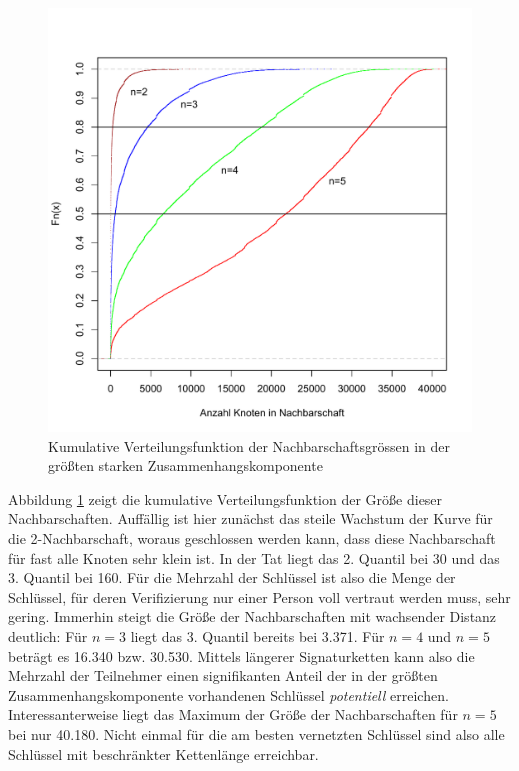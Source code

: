 \begin{figure}[th!]
  \centering
  \includegraphics[scale=0.6]{images/neighbourhood-cdf.pdf}
  \caption{Kumulative Verteilungsfunktion der Nachbarschaftsgrössen
    in der größten starken Zusammenhangskomponente}
  \label{fig:neighbourhood-cdf}
\end{figure}

Abbildung \ref{fig:neighbourhood-cdf} zeigt die kumulative
Verteilungsfunktion der Größe dieser Nachbarschaften. Auffällig
ist hier zunächst das steile Wachstum der Kurve für die
2-Nachbarschaft, woraus geschlossen werden kann, dass diese
Nachbarschaft für fast alle Knoten sehr klein ist. In der Tat liegt
das 2. Quantil bei 30 und das 3. Quantil bei 160. Für die Mehrzahl
der Schlüssel ist also die Menge der Schlüssel, für deren
Verifizierung nur einer Person voll vertraut werden muss, sehr
gering. Immerhin steigt die Größe der Nachbarschaften mit
wachsender Distanz deutlich: Für $n=3$ liegt das 3. Quantil bereits
bei 3.371. Für $n=4$ und $n=5$ beträgt es 16.340 bzw. 30.530. Mittels
längerer Signaturketten kann also die Mehrzahl der Teilnehmer einen
signifikanten Anteil der in der größten Zusammenhangskomponente
vorhandenen Schlüssel \emph{potentiell}
erreichen. Interessanterweise liegt das Maximum der
Größe der Nachbarschaften für $n=5$ bei nur 40.180. Nicht einmal für
die am besten vernetzten Schlüssel sind also alle Schlüssel mit
beschränkter Kettenlänge erreichbar.

